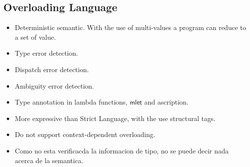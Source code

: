 \documentclass[preprint,authoryear,sort&compress,9pt,nocopyrightspace]{article}
\newcommand{\semanticC}{Strict Language}
\newcommand{\semanticD}{Overloading Language}
\begin{document}
\subsection{\semanticD}
\begin{itemize}
\item Deterministic semantic. With the use of multi-values a program can reduce to a set of value.
\item Type error detection.
\item Dispatch error detection.
\item Ambiguity error detection.
\item Type annotation in lambda functions, $\mathsf{mlet}$ and ascription.
\item More expressive than \semanticC, with the use structural tags.
\item Do not support context-dependent overloading.
\item Como no esta verificacda la informacion de tipo, no se puede decir nada acerca de la semantica.
\end{itemize}
\end{document}
